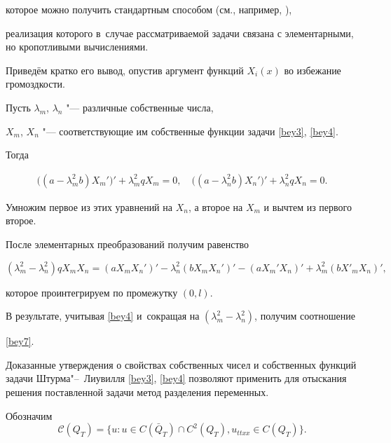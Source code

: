 которое можно получить стандартным способом (см., например, \cite[с.~159]{T-S}),

реализация которого в~случае рассматриваемой задачи связана с элементарными, но кропотливыми вычислениями. 

Приведём кратко его вывод, опустив аргумент функций  $X_i(x)$ во избежание громоздкости.



Пусть $\lambda_m$, $\lambda_n$ "--- различные собственные числа, 

$X_m$, $X_n$ "--- соответствующие им собственные функции задачи \eqref{bey3}, \eqref{bey4}. 

Тогда

\begin{gather*}

\bigl((a-\lambda_m^2b)X_m'\bigr)'+\lambda_m^2qX_m=0,

\quad 

\bigl((a-\lambda_n^2b)X_n'\bigr)'+\lambda_n^2qX_n=0.

\end{gather*}

Умножим первое из этих уравнений на $X_n$, а второе на $X_m$ и вычтем из первого второе.

После элементарных преобразований получим равенство

$$(\lambda_m^2-\lambda_n^2)qX_mX_n=(aX_mX_n')'-\lambda_n^2(bX_mX_n')'-(aX_m'X_n)'+

\lambda_m^2(bX'_mX_n)',$$

которое проинтегрируем по промежутку $(0, l)$.

В результате, учитывая \eqref{bey4} и~сокращая на $(\lambda_m^2-\lambda_n^2)$, получим   соотношение

\eqref{bey7}.



Доказанные утверждения о свойствах собственных чисел и собственных функций задачи Штурма"--~Лиувилля \eqref{bey3}, \eqref{bey4} позволяют применить для отыскания решения поставленной задачи метод разделения переменных.



\smallskip




Обозначим $$\mathcal{C}(Q_T)=\{u: u\in C(\bar{Q}_T)\cap C^2(Q_T), u_{ttxx}\in C(Q_T)\}.$$



\smallskip



